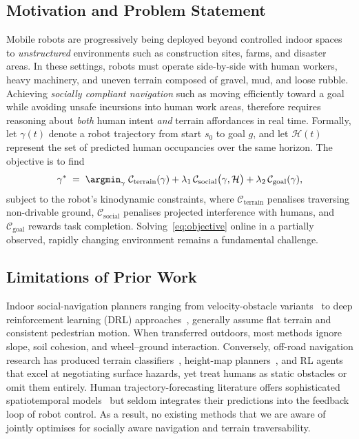 
\subsection{Motivation and Problem Statement}
Mobile robots are progressively being deployed beyond controlled indoor spaces to \emph{unstructured} environments such as construction sites, farms, and disaster areas.  In these settings, robots must operate side-by-side with human workers, heavy machinery, and uneven terrain composed of gravel, mud, and loose rubble.  Achieving \emph{socially compliant navigation} such as moving efficiently toward a goal while avoiding unsafe incursions into human work areas, therefore requires reasoning about \emph{both} human intent \emph{and} terrain affordances in real time.  Formally, let $\gamma(t)$ denote a robot trajectory from start $s_{0}$ to goal $g$, and let $\mathcal{H}(t)$ represent the set of predicted human occupancies over the same horizon.  The objective is to find
\begin{equation}
\gamma^{*} \;=\; \argmin_{\gamma}
\;\mathcal{C}_{\text{terrain}}(\gamma)
+\lambda_{1}\,\mathcal{C}_{\text{social}}\bigl(\gamma,\mathcal{H}\bigr)
+\lambda_{2}\,\mathcal{C}_{\text{goal}}(\gamma),
\label{eq:objective}
\end{equation}
subject to the robot’s kinodynamic constraints, where $\mathcal{C}_{\text{terrain}}$ penalises traversing non-drivable ground, $\mathcal{C}_{\text{social}}$ penalises projected interference with humans, and $\mathcal{C}_{\text{goal}}$ rewards task completion.  Solving~\eqref{eq:objective} online in a partially observed, rapidly changing environment remains a fundamental challenge.

\subsection{Limitations of Prior Work}
Indoor social-navigation planners ranging from velocity-obstacle variants~\cite{van2011reciprocal} to deep reinforcement learning (DRL) approaches~\cite{everett2021collision}, generally assume flat terrain and consistent pedestrian motion.  When transferred outdoors, most methods ignore slope, soil cohesion, and wheel–ground interaction.  Conversely, off-road navigation research has produced terrain classifiers~\cite{brooks2023srpa}, height-map planners~\cite{rankin2024vtr}, and RL agents~\cite{replace} that excel at negotiating surface hazards, yet treat humans as static obstacles or omit them entirely.  Human trajectory-forecasting literature offers sophisticated spatiotemporal models~\cite{kosaraju2020social} but seldom integrates their predictions into the feedback loop of robot control.  As a result, no existing methods that we are aware of jointly optimises for socially aware navigation and terrain traversability.

